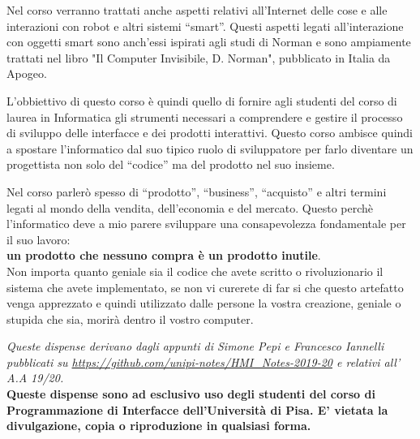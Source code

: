 Nel corso verranno trattati anche aspetti relativi all'Internet delle cose e alle interazioni con robot e altri sistemi ``smart''. Questi aspetti legati all'interazione con oggetti smart sono anch'essi ispirati agli studi di Norman e sono ampiamente trattati nel libro "Il Computer Invisibile, D. Norman", pubblicato in Italia da Apogeo.

L'obbiettivo di questo corso è quindi quello di fornire agli studenti del corso di laurea in Informatica gli strumenti necessari a comprendere e gestire il processo di sviluppo delle interfacce e dei prodotti interattivi. Questo corso ambisce quindi a spostare l'informatico dal suo tipico ruolo di sviluppatore per farlo diventare un progettista non solo del ``codice'' ma del prodotto nel suo insieme.

Nel corso parlerò spesso di ``prodotto'', ``business'', ``acquisto'' e altri termini legati al mondo della vendita, dell'economia e del mercato. Questo perchè l'informatico deve a mio parere sviluppare una consapevolezza fondamentale per il suo lavoro:\\

\textbf{un prodotto che nessuno compra è un prodotto inutile}. \\

Non importa quanto geniale sia il codice che avete scritto o rivoluzionario il sistema che avete implementato, se non vi curerete di far si che questo artefatto venga apprezzato e quindi utilizzato dalle persone la vostra creazione, geniale o stupida che sia, morirà dentro il vostro computer.


\textit{Queste dispense derivano dagli appunti di Simone Pepi e Francesco Iannelli pubblicati su \url{https://github.com/unipi-notes/HMI_Notes-2019-20} e relativi all' A.A 19/20.}\\

\textbf{Queste dispense sono ad esclusivo uso degli studenti del corso di Programmazione di Interfacce dell'Università di Pisa. E' vietata la divulgazione, copia o riproduzione in qualsiasi forma.}
